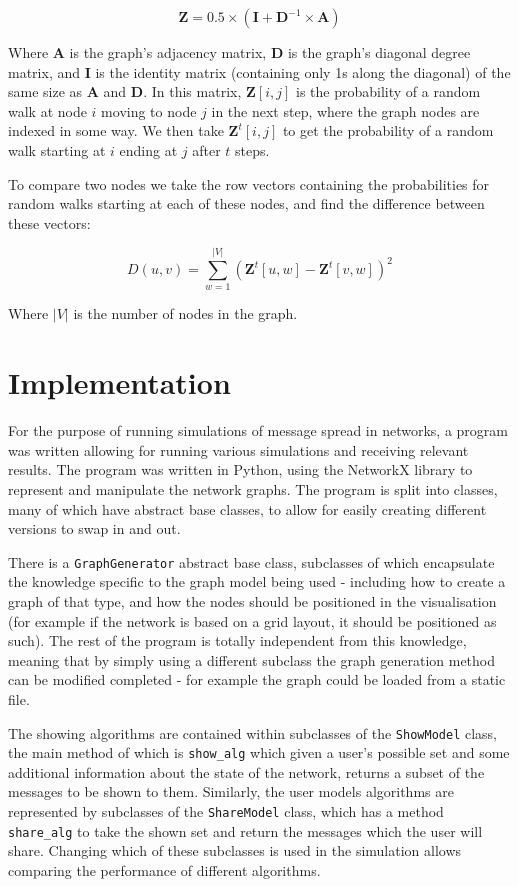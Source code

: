 \documentclass[bsc,frontabs,twoside,singlespacing,parskip,deptreport]{infthesis}     %
\begin{document}
\begin{equation}
\textbf{Z} = 0.5 \times (\textbf{I} + \textbf{D}^{-1} \times \textbf{A})
\end{equation}

Where $\textbf{A}$ is the graph's adjacency matrix, $\textbf{D}$ is the graph's diagonal degree matrix, and $\textbf{I}$ is the identity matrix (containing only 1s along the diagonal) of the same size as $\textbf{A}$ and $\textbf{D}$. In this matrix, $\textbf{Z}[i, j]$ is the probability of a random walk at node $i$ moving to node $j$ in the next step, where the graph nodes are indexed in some way. We then take $\textbf{Z}^{t}[i, j]$ to get the probability of a random walk starting at $i$ ending at $j$ after $t$ steps.

To compare two nodes we take the row vectors containing the probabilities for random walks starting at each of these nodes, and find the difference between these vectors:

\begin{equation}
D(u, v) = \sum_{w=1}^{|V|} (\textbf{Z}^{t}[u, w] - \textbf{Z}^{t}[v, w])^{2}
\end{equation}

Where $|V|$ is the number of nodes in the graph.

\chapter{Implementation}
For the purpose of running simulations of message spread in networks, a program was written allowing for running various simulations and receiving relevant results. The program was written in Python, using the NetworkX library\cite{NetworkX} to represent and manipulate the network graphs. The program is split into classes, many of which have abstract base classes, to allow for easily creating different versions to swap in and out.

There is a \texttt{GraphGenerator} abstract base class, subclasses of which encapsulate the knowledge specific to the graph model being used - including how to create a graph of that type, and how the nodes should be positioned in the visualisation (for example if the network is based on a grid layout, it should be positioned as such). The rest of the program is totally independent from this knowledge, meaning that by simply using a different subclass the graph generation method can be modified completed - for example the graph could be loaded from a static file.

The showing algorithms are contained within subclasses of the \texttt{ShowModel} class, the main method of which is \texttt{show\_alg} which given a user's possible set and some additional information about the state of the network, returns a subset of the messages to be shown to them. Similarly, the user models algorithms are represented by subclasses of the \texttt{ShareModel} class, which has a method \texttt{share\_alg} to take the shown set and return the messages which the user will share. Changing which of these subclasses is used in the simulation allows comparing the performance of different algorithms.
\end{document}
